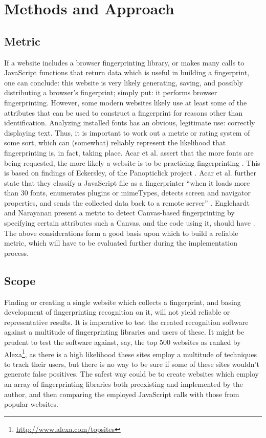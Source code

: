 \documentclass[
    fontsize=12pt,
    headings=small,
    parskip=half,
    bibliography=totoc,
    numbers=noenddot,
    open=any
    ]{scrreprt}
\begin{document}

\begingroup
\renewcommand{\cleardoublepage}{}
\renewcommand{\clearpage}{}
\chapter{Methods and Approach} %
\endgroup

\section{Metric}
If a website includes a browser fingerprinting library, or makes many calls to JavaScript functions that return
data which is useful in building a fingerprint, one can conclude: this website is very likely generating,
saving, and possibly distributing a browser's fingerprint; simply put: it performs browser fingerprinting.
However, some modern websites likely use at least some of the attributes that can be used to construct a fingerprint
for reasons other than identification. Analyzing installed fonts has an obvious, legitimate use: correctly displaying
text. Thus, it is important to work out a metric or rating system of some sort, which can
(somewhat) reliably represent the likelihood that fingerprinting is, in fact, taking place.
Acar et al. assert that the more fonts are being requested, the more likely a website is to
be practicing fingerprinting \cite{DBLP:conf/ccs/AcarJNDGPP13}.
This is based on findings of Eckersley, of the Panopticlick project \cite{eckersley2010unique}.
Acar et al. further state that they classify a JavaScript file as a fingerprinter ``when it loads
more than 30 fonts, enumerates plugins or mimeTypes, detects screen and navigator properties, and sends the
collected data back to a remote server'' \cite{DBLP:conf/ccs/AcarJNDGPP13}.
Englehardt and Narayanan present a metric to detect Canvas-based fingerprinting by specifying certain
attributes such a Canvas, and the code using it, should have \cite{DBLP:conf/ccs/EnglehardtN16}.
The above considerations form a good basis upon which to build a reliable metric, which will have to be
evaluated further during the implementation process.

\section{Scope}
Finding or creating a single website which collects a fingerprint, and basing development of fingerprinting
recognition on it, will not yield reliable or representative results. It is imperative to test
the created recognition software against a multitude of fingerprinting libraries and users of these.
It might be prudent to test the software against, say, the top 500 websites as ranked by
Alexa\footnote{\url{http://www.alexa.com/topsites}}, as there is a high likelihood these sites employ
a multitude of techniques to track their users, but there is no way to be sure if some of these sites wouldn't
generate false positives.
The safest way could be to create websites which employ an array of fingerprinting libraries both preexisting and
implemented by the author, and then comparing the employed JavaScript calls with those from popular websites.
\end{document}

